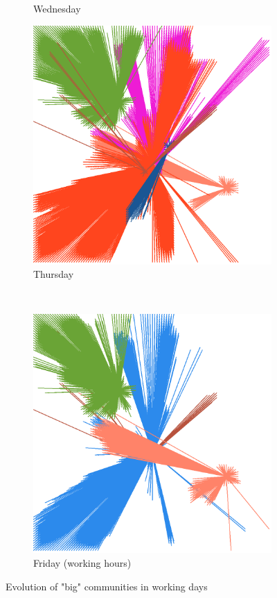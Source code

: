 \documentclass[12pt,a4paper]{article}
\begin{document}
\begin{figure}[H]
\begin{subfigure}[b]{0.48\textwidth}
\caption{Wednesday}
\end{subfigure}
\begin{subfigure}[b]{0.48\textwidth}
\includegraphics[width=\textwidth]{weekDef/edges-4Thu-big.png}
\caption{Thursday}
\end{subfigure}
\\
\begin{subfigure}[b]{0.48\textwidth}
\includegraphics[width=\textwidth]{weekDef/edges-5Fri-big.png}
\caption{Friday (working hours)}
\end{subfigure}

\caption{Evolution of "big" communities in working days}
\end{figure}
\end{document}
